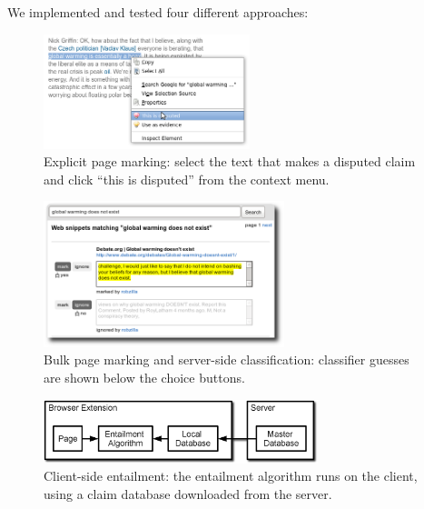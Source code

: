 \documentclass{www2010-submission}
\begin{document}
We implemented and tested four different approaches:

\begin{figure}[tb]
	\begin{center}
	\includegraphics[width=6cm]{pictures/mark_disputed.png}
	\caption{Explicit page marking: select the text that makes a disputed claim and click ``this is disputed'' from the context menu.}
	\label{mark_disputed}
	\end{center}
\end{figure}

\begin{figure}[tb]
	\begin{center}
	\includegraphics[width=7cm]{pictures/training2.png}
	\caption{Bulk page marking and server-side classification: classifier guesses are shown below the choice buttons.}
	\label{training}
	\end{center}
\end{figure}

\begin{figure}[t]
	\begin{center}
	\includegraphics[width=8cm]{pictures/nlp_client_server2.png}
	\caption{Client-side entailment: the entailment algorithm runs on the client, using a claim database downloaded from the server.}
	\label{nlp_client_server}
	\end{center}
\end{figure}
\end{document}
